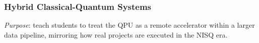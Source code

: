 

%


\subsubsection{Hybrid Classical-Quantum Systems}

\emph{Purpose}: teach students to treat the QPU as a remote accelerator within 
a larger data pipeline, mirroring how real projects are executed in the NISQ era.



